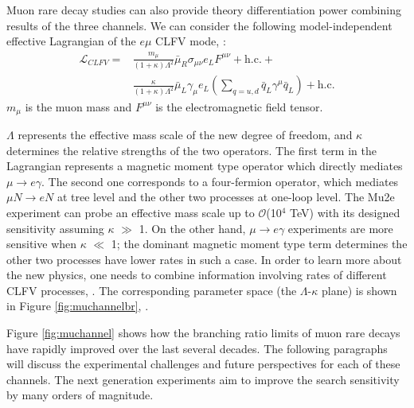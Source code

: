 Muon rare decay studies can also provide theory differentiation power 
combining results of the three channels. We can consider the following model-independent 
effective Lagrangian of the $e \mu$ CLFV mode, \cite{doi:10.1146/annurev-nucl-100809-131949}:
\begin{equation}\label{LCF}
\begin{aligned}
\mathscr{L}_{C L F V}= & \frac{m_\mu}{(1+\kappa) \Lambda^2} \bar{\mu}_R \sigma_{\mu \nu} e_L F^{\mu \nu}+\text{h.c.}+ \\
&\frac{\kappa}{(1+\kappa) \Lambda^2} \bar{\mu}_L \gamma_\mu e_L\left(\sum_{q=u, d} \bar{q}_L \gamma^\mu \bar{q}_L\right)+\text{h.c.}
\end{aligned}
\end{equation}
$m_\mu$ is the muon mass and  $F^{\mu \nu}$ is the electromagnetic field tensor.

$\Lambda$ represents the effective mass scale of the new degree of freedom, and $\kappa$
determines the relative strengths of the two operators. The first term in the Lagrangian represents a
magnetic moment type operator which directly mediates $\mu \rightarrow e \gamma$. 
The second one corresponds to a four-fermion operator, 
which mediates $\mu N \rightarrow eN$ at tree level and 
the other two processes at one-loop level.
The Mu2e experiment can probe an effective mass scale up 
to $\mathcal{O}$(10$^4$ TeV) with its designed sensitivity assuming $\kappa$ $\gg$ 1.
On the other hand, $\mu \rightarrow e\gamma$ experiments 
are more sensitive when $\kappa$ $\ll$ 1; the dominant magnetic
moment type term determines the other two processes have 
lower rates in such a case. In order to learn more about the new
physics, one needs to combine information involving rates 
of different CLFV processes, \cite{osti_1042577}.
The corresponding parameter space (the $\Lambda$-$\kappa$ plane) is shown in 
Figure \ref{fig:muchannelbr}, \cite{doi:10.1146/annurev-nucl-100809-131949}. 

Figure \ref{fig:muchannel} 
shows how the branching ratio limits of muon rare decays
have rapidly improved over the last several decades. The following paragraphs 
will discuss the experimental challenges and future perspectives 
for each of these channels. The next generation 
experiments aim to improve the search sensitivity by many orders of magnitude. 

